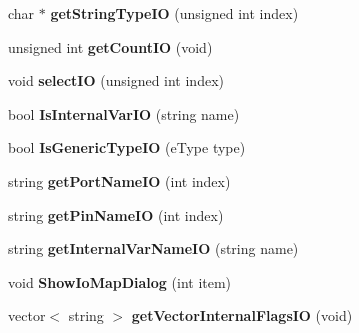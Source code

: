 \begin{DoxyCompactItemize}
\item 
\hypertarget{class_ladder_diagram_ae256e6b8617796697736dc253633648c}{char $\ast$ {\bfseries get\-String\-Type\-I\-O} (unsigned int index)}\label{class_ladder_diagram_ae256e6b8617796697736dc253633648c}

\item 
\hypertarget{class_ladder_diagram_a59a3d4b988861923358424e49d3b3798}{unsigned int {\bfseries get\-Count\-I\-O} (void)}\label{class_ladder_diagram_a59a3d4b988861923358424e49d3b3798}

\item 
\hypertarget{class_ladder_diagram_a07cb697fd117e1778dddc31b38b6ecbf}{void {\bfseries select\-I\-O} (unsigned int index)}\label{class_ladder_diagram_a07cb697fd117e1778dddc31b38b6ecbf}

\item 
\hypertarget{class_ladder_diagram_a5b63994e500d1014c98a4264019a658f}{bool {\bfseries Is\-Internal\-Var\-I\-O} (string name)}\label{class_ladder_diagram_a5b63994e500d1014c98a4264019a658f}

\item 
\hypertarget{class_ladder_diagram_a5e627793a840430fe92d45dcde62d22c}{bool {\bfseries Is\-Generic\-Type\-I\-O} (e\-Type type)}\label{class_ladder_diagram_a5e627793a840430fe92d45dcde62d22c}

\item 
\hypertarget{class_ladder_diagram_ac3898bc65d3146f4c365e79584cf2aad}{string {\bfseries get\-Port\-Name\-I\-O} (int index)}\label{class_ladder_diagram_ac3898bc65d3146f4c365e79584cf2aad}

\item 
\hypertarget{class_ladder_diagram_afa77dd551fbcfe1d913babdae98a43b2}{string {\bfseries get\-Pin\-Name\-I\-O} (int index)}\label{class_ladder_diagram_afa77dd551fbcfe1d913babdae98a43b2}

\item 
\hypertarget{class_ladder_diagram_a15091374c2103529dd2e31eb724ddb17}{string {\bfseries get\-Internal\-Var\-Name\-I\-O} (string name)}\label{class_ladder_diagram_a15091374c2103529dd2e31eb724ddb17}

\item 
\hypertarget{class_ladder_diagram_a989151eaab93c43629382c730a523c4c}{void {\bfseries Show\-Io\-Map\-Dialog} (int item)}\label{class_ladder_diagram_a989151eaab93c43629382c730a523c4c}

\item 
\hypertarget{class_ladder_diagram_abb9103b82f8696f34d4ef192c6583c8c}{vector$<$ string $>$ {\bfseries get\-Vector\-Internal\-Flags\-I\-O} (void)}\label{class_ladder_diagram_abb9103b82f8696f34d4ef192c6583c8c}


\end{DoxyCompactItemize}
